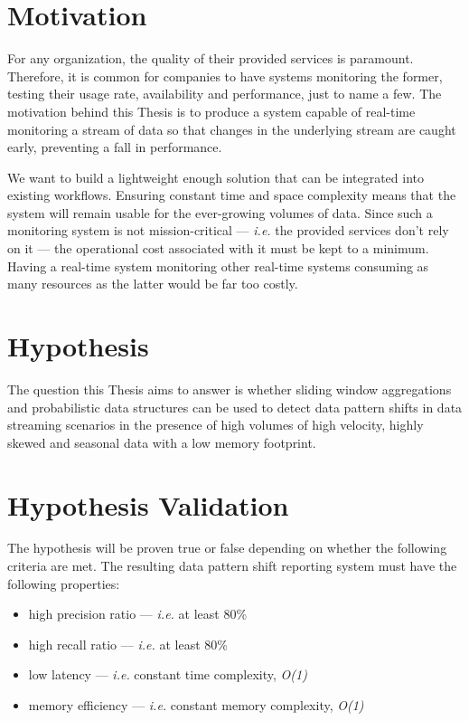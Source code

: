 \section{Motivation} \label{sec:motivation}
For any organization, the quality of their provided services is paramount. Therefore, it is common for companies to have systems monitoring the former, testing their usage rate, availability and performance, just to name a few. The motivation behind this Thesis is to produce a system capable of real-time monitoring a stream of data so that changes in the underlying stream are caught early, preventing a fall in performance. 

We want to build a lightweight enough solution that can be integrated into existing workflows. Ensuring constant time and space complexity means that the system will remain usable for the ever-growing volumes of data. Since such a monitoring system is not mission-critical --- \textit{i.e.} the provided services don't rely on it --- the operational cost associated with it must be kept to a minimum. Having a real-time system monitoring other real-time systems consuming as many resources as the latter would be far too costly.


\section{Hypothesis} \label{sec:hypothesis}
The question this Thesis aims to answer is whether sliding window aggregations and probabilistic data structures can be used to detect data pattern shifts in data streaming scenarios in the presence of high volumes of high velocity, highly skewed and seasonal data with a low memory footprint.

\section{Hypothesis Validation} \label{sec:validation}
The hypothesis will be proven true or false depending on whether the following criteria are met. The resulting data pattern shift reporting system must have the following properties:
\begin{itemize}
    \item high precision ratio --- \textit{i.e.} at least 80\%
    \item high recall ratio --- \textit{i.e.} at least 80\%
    \item low latency --- \textit{i.e.} constant time complexity, \textit{O(1)}
    \item memory efficiency --- \textit{i.e.} constant memory complexity, \textit{O(1)}
\end{itemize}

